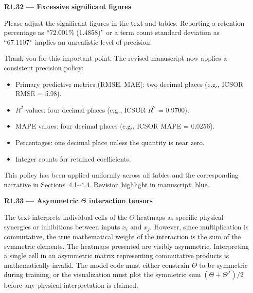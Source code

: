 \documentclass[a4paper,11pt]{article}
\newcommand{\reviewlabel}[1]{\noindent\textbf{\textcolor{accentblue}{#1}}\par\medskip}
\newcommand{\revhighlight}[2]{\textcolor{#1}{Revision highlight in manuscript: #2.}}
\begin{document}
\reviewlabel{R1.32 --- Excessive significant figures}
\begin{reviewbox}
Please adjust the significant figures in the text and tables. Reporting a retention percentage as ``72.001\% (1.4858)'' or a term count standard deviation as ``67.1107'' implies an unrealistic level of precision.
\end{reviewbox}

Thank you for this important point. The revised manuscript now applies a consistent precision policy:
\begin{itemize}[nosep]
\item Primary predictive metrics (RMSE, MAE): two decimal places (e.g., ICSOR RMSE = 5.98).
\item $R^2$ values: four decimal places (e.g., ICSOR $R^2$ = 0.9700).
\item MAPE values: four decimal places (e.g., ICSOR MAPE = 0.0256).
\item Percentages: one decimal place unless the quantity is near zero.
\item Integer counts for retained coefficients.
\end{itemize}
This policy has been applied uniformly across all tables and the corresponding narrative in Sections~4.1--4.4. \revhighlight{revDefault}{blue}

\reviewlabel{R1.33 --- Asymmetric $\Theta$ interaction tensors}
\begin{reviewbox}
The text interprets individual cells of the $\Theta$ heatmaps as specific physical synergies or inhibitions between inputs $x_i$ and $x_j$. However, since multiplication is commutative, the true mathematical weight of the interaction is the sum of the symmetric elements. The heatmaps presented are visibly asymmetric. Interpreting a single cell in an asymmetric matrix representing commutative products is mathematically invalid. The model code must either constrain $\Theta$ to be symmetric during training, or the visualization must plot the symmetric sum $(\Theta + \Theta^T)/2$ before any physical interpretation is claimed.
\end{reviewbox}
\end{document}
